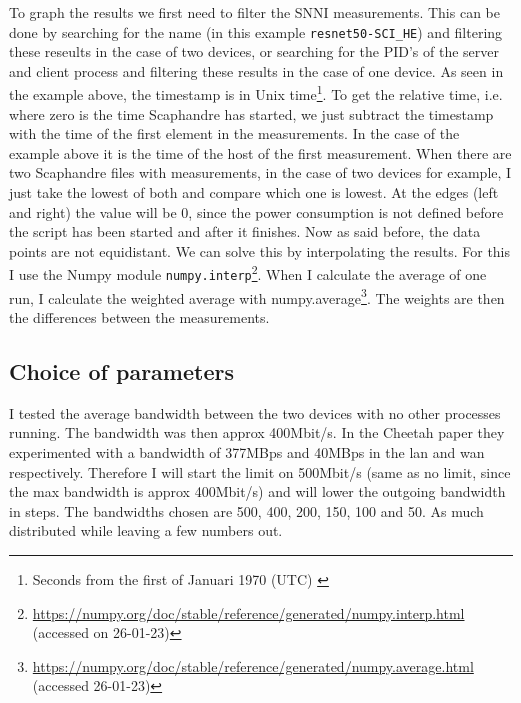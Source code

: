 \documentclass[../thesis.tex]{subfiles}
\begin{document}
To graph the results we first need to filter the SNNI measurements. This can be done by searching for the name (in this example \verb|resnet50-SCI_HE|) and filtering these reseults in the case of two devices, or searching for the PID's of the server and client process and filtering these results in the case of one device. As seen in the example above, the timestamp is in Unix time\footnote{Seconds from the first of Januari 1970 (UTC) \url{}}. To get the relative time, i.e. where zero is the time Scaphandre has started, we just subtract the timestamp with the time of the first element in the measurements. In the case of the example above it is the time of the host of the first measurement. When there are two Scaphandre files with measurements, in the case of two devices for example, I just take the lowest of both and compare which one is lowest. At the edges (left and right) the value will be 0, since the power consumption is not defined before the script has been started and after it finishes. Now as said before, the data points are not equidistant. We can solve this by interpolating the results. For this I use the Numpy module \verb|numpy.interp|\footnote{\url{https://numpy.org/doc/stable/reference/generated/numpy.interp.html} (accessed on 26-01-23)}. When I calculate the average of one run, I calculate the weighted average with numpy.average\footnote{\url{https://numpy.org/doc/stable/reference/generated/numpy.average.html} (accessed 26-01-23)}. The weights are then the differences between the measurements. 

\subsection{Choice of parameters}
I tested the average bandwidth between the two devices with no other processes running. The bandwidth was then \color{red} approx 400Mbit/s\color{black}. In the Cheetah paper they experimented with a bandwidth of 377MBps and 40MBps in the lan and wan respectively. Therefore I will start the limit on 500Mbit/s (same as no limit, since the max bandwidth is \color{red} approx 400Mbit/s\color{black}) and will lower the outgoing bandwidth in steps. The bandwidths chosen are 500, 400, 200, 150, 100 and 50. As much distributed while leaving a few numbers out. 
\end{document}
